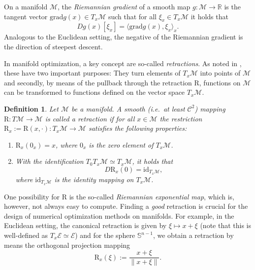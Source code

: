 \documentclass[a4paper, 12pt]{article}
\numberwithin{equation}{section}
\theoremstyle{bolddef}
\newtheorem{definition}{Definition}[section]
\theoremstyle{definition}
\theoremstyle{boldplain}
\newcommand{\R}{\mathbb{R}}
\newcommand{\grad}{\mathrm{grad}}
\newcommand{\retr}{\mathrm{R}}
\begin{document}
On a manifold $\mathcal{M}$, the \emph{Riemannian gradient} of a smooth map $g: \mathcal{M} \to \R$ is the tangent vector $\grad g(x) \in T_x \mathcal{M}$ such that for all $\xi_x \in T_x \mathcal{M}$ it holds that
\begin{equation*}
	Dg(x)[\xi_x] = \langle \grad g(x), \xi_x\rangle_x.
\end{equation*}
Analogous to the Euclidean setting, the negative of the Riemannian gradient is the direction of steepest descent.

In manifold optimization, a key concept are so-called \emph{retractions}. As noted in \cite{Absil2008}, these have two important purposes: They turn elements of $T_x \mathcal{M}$ into points of $\mathcal{M}$ and secondly, by means of the pullback through the retraction $\retr$, functions on $\mathcal{M}$ can be transformed to functions defined on the vector space $T_x \mathcal{M}$.
\begin{definition}
	Let $\mathcal{M}$ be a manifold. A smooth (i.e.\ at least $\mathcal{C}^2$) mapping $\retr: T \mathcal{M} \to \mathcal{M}$ is called a \emph{retraction} if for all $x \in \mathcal{M}$ the restriction $\retr_x := \retr(x, \cdot) : T_x\mathcal{M} \to \mathcal{M}$ satisfies the following properties:
	\begin{enumerate}
		\item $\retr_x(0_x) = x$, where $0_x$ is the zero element of $T_x\mathcal{M}$.
		\item With the identification $T_0 T_x \mathcal{M} \simeq T_x\mathcal{M}$, it holds that 
			\begin{equation*}
				D\retr_x(0) = \mathrm{id}_{T_x \mathcal{M}},
			\end{equation*}
		where $\mathrm{id}_{T_x \mathcal{M}}$ is the identity mapping on $T_x \mathcal{M}$.
	\end{enumerate}
\end{definition}
One possibility for $\retr$ is the so-called \emph{Riemannian exponential map}, which is, however, not always easy to compute. Finding a \emph{good} retraction is crucial for the design of numerical optimization methods on manifolds. For example, in the Euclidean setting, the canonical retraction is given by $\xi \mapsto x+\xi$ (note that this is well-defined as $T_x \mathcal{E} \simeq \mathcal{E}$) and for the sphere $\mathbb{S}^{n-1}$, we obtain a retraction by means the orthogonal projection mapping
\begin{equation*}
	\retr_x (\xi) := \frac{x+\xi}{\|x+\xi\|}.
\end{equation*}
\end{document}

